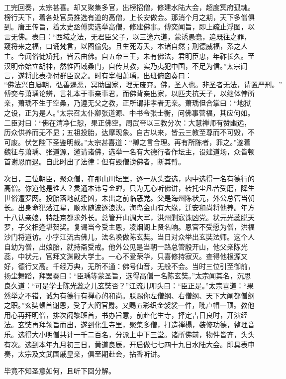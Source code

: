 \documentclass[12pt]{lsbook}
\begin{document}
工完回奏，太宗甚喜。却又聚集多官，出榜招僧，修建水陆大会，超度冥府孤魂。榜行天下，着各处官员推选有道的高僧，上长安做会。那消个月之期，天下多僧俱到。唐王传旨，着太史丞傅奕选举高僧，修建佛事。傅奕闻旨，即上疏止浮图，以言无佛。表曰：“西域之法，无君臣父子，以三途六道，蒙诱愚蠢，追既往之罪，窥将来之福，口诵梵言，以图偷免。且生死寿夭，本诸自然；刑德威福，系之人主。今闻俗徒矫托，皆云由佛。自五帝三王，未有佛法，君明臣忠，年祚长久。至汉明帝始立胡神，然惟西域桑门，自传其教，实乃夷犯中国，不足为信。”太宗闻言，遂将此表掷付群臣议之。时有宰相萧瑀，出班俯囟奏曰：
\[
“佛法兴自屡朝，弘善遏恶，冥助国家，理无废弃。佛，圣人也。非圣者无法，请置严刑。”
\]
傅奕与萧瑀论辨，言礼本于事亲事君，而佛背亲出家，以匹夫抗天子，以继体悖所亲，萧瑀不生于空桑，乃遵无父之教，正所谓非孝者无亲。萧瑀但合掌曰：“地狱之设，正为是人。”太宗召太仆卿张道源、中书令张士衡，问佛事营福，其应何如。二臣对曰：“佛在清净仁恕，果正佛空。周武帝以三教分次：大慧禅师有赞幽远，历众供养而无不显；五祖投胎，达摩现象。自古以来，皆云三教至尊而不可毁，不可废。伏乞陛下圣鉴明裁。”太宗甚喜道：“卿之言合理。再有所陈者，罪之。”遂着魏征与萧瑀、张道源，邀请诸佛，选举一名有大德行者作坛主，设建道场，众皆顿首谢恩而退。自此时出了法律：但有毁僧谤佛者，断其臂。

次日，三位朝臣，聚众僧，在那山川坛里，逐一从头查选，内中选得一名有德行的高僧。你道他是谁人？灵通本讳号金蝉，只为无心听佛讲，转托尘凡苦受磨，降生世俗遭罗网。投胎落地就逢凶，未出之前临恶党。父是海州陈状元，外公总管当朝长。出身命犯落江星，顺水随波逐浪泱。海岛金山有大缘，迁安和尚将他养。年方十八认亲娘，特赴京都求外长。总管开山调大军，洪州剿寇诛凶党。状元光蕊脱天罗，子父相逢堪贺奖。复谒当今受主恩，凌烟阁上贤名响。恩官不受愿为僧，洪福沙门将道访。小字江流古佛儿，法名唤做陈玄奘。当日对众举出玄奘法师。这个人自幼为僧，出娘胎，就持斋受戒。他外公见是当朝一路总管殷开山，他父亲陈光蕊，中状元，官拜文渊殿大学士。一心不爱荣华，只喜修持寂灭。查得他根源又好，德行又高。千经万典，无所不通：佛号仙音，无般不会。当时三位引至御前，扬尘舞蹈，拜罢奏曰：“臣瑀等蒙圣旨，选得高僧一名陈玄奘。”太宗闻其名，沉思良久道：“可是学士陈光蕊之儿玄奘否？”江流儿叩头曰：“臣正是。”太宗喜道：“果然举之不错，诚为有德行有禅心的和尚。朕赐你左僧纲、右僧纲、天下大阐都僧纲之职。”玄奘顿首谢恩，受了大阐官爵。又赐五彩织金袈裟一件，毗卢帽一顶。教他用心再拜明僧，排次阇黎班首，书办旨意，前赴化生寺，择定吉日良时，开演经法。玄奘再拜领旨而出，遂到化生寺里，聚集多僧，打造禅榻，装修功德，整理音乐。选得大小明僧共计一千二百名，分派上中下三堂。诸所佛前，物件皆齐，头头有次。选到本年九月初三日，黄道良辰，开启做七七四十九日水陆大会。即具表申奏，太宗及文武国戚皇亲，俱至期赴会，拈香听讲。

毕竟不知圣意如何，且听下回分解。
\makebackcover
\end{document}
